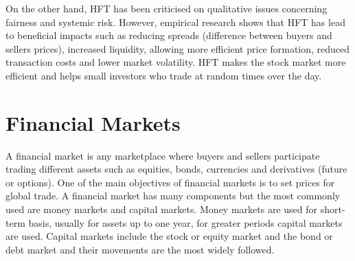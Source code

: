 On the other hand, HFT has been criticised on qualitative issues concerning
fairness and systemic risk. However, empirical research shows that HFT has lead to
beneficial impacts such as reducing spreads (difference between buyers and
sellers prices), increased liquidity, allowing more efficient price formation,
reduced transaction costs and lower market volatility. HFT makes the stock market more efficient and helps small investors who trade at random times over the day. 


\section{Financial Markets}

A financial market is any marketplace where buyers and sellers participate
trading different assets such as equities, bonds, currencies and derivatives
(future or options). One of the main objectives of financial markets is to set
prices for global trade.
A financial market has many components but the most commonly used are money
markets and capital markets. Money markets are used for short-term basis,
usually for assets up to one year, for greater periods capital markets are used.
Capital markets include the stock or equity market and the bond or debt market
and their movements are the most widely followed.

